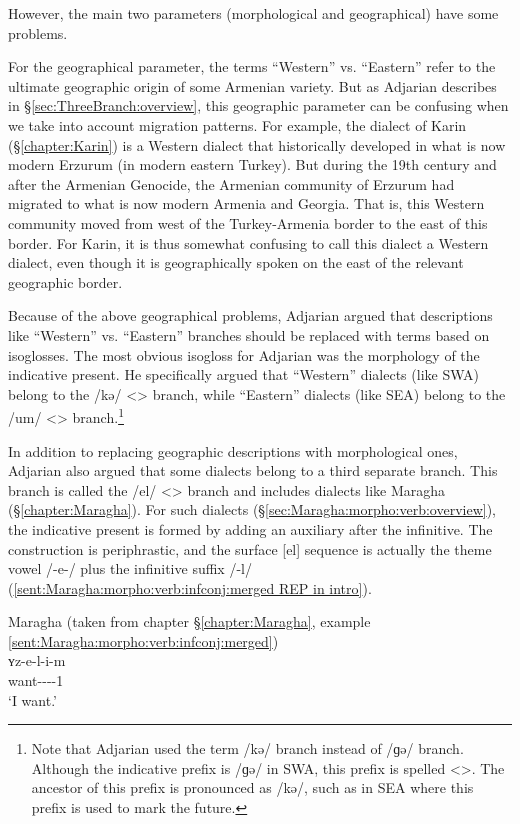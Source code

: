 \documentclass[output=paper]{langscibook}
\begin{document}
However, the main two parameters (morphological and geographical) have some problems. 

For the geographical parameter, the terms ``Western'' vs. ``Eastern'' refer to the ultimate geographic origin of some Armenian variety. But as Adjarian describes in \S\ref{sec:ThreeBranch:overview}, this geographic parameter can be confusing when we take into account migration patterns. For example, the dialect of Karin (\S\ref{chapter:Karin}) is a Western dialect that historically developed in what is now modern Erzurum (in modern eastern Turkey). But during the 19th century and after the Armenian Genocide, the Armenian community of Erzurum had migrated to what is now modern Armenia and Georgia. That is, this Western community moved from west of the Turkey-Armenia border to the east of this border. For Karin, it is thus somewhat confusing to call this dialect a Western dialect, even though it is geographically spoken on the east of the relevant geographic border.

Because of the above geographical problems, Adjarian argued that descriptions like ``Western'' vs. ``Eastern'' branches should be replaced with terms based on isoglosses. The most obvious isogloss for Adjarian was the morphology of the indicative present. He specifically argued that ``Western'' dialects (like SWA) belong to the /kə/ <> branch, while ``Eastern'' dialects (like SEA) belong to the /um/ <> branch.\footnote{Note that Adjarian used the term /kə/ branch instead of /ɡə/ branch. Although the indicative prefix is /ɡə/ in SWA, this prefix is spelled <>. The ancestor of this prefix is pronounced as /kə/, such as in SEA where this prefix is used to mark the  future.}

In addition to replacing geographic descriptions with morphological ones, Adjarian also argued that some dialects belong to a third separate branch. This branch is called the /el/ <> branch and includes dialects like Maragha (\S\ref{chapter:Maragha}). For such dialects (\S\ref{sec:Maragha:morpho:verb:overview}), the indicative present is formed by adding an auxiliary after the infinitive. The construction is periphrastic, and the surface [el] sequence is actually the theme vowel /-e-/ plus the infinitive suffix /-l/ (\ref{sent:Maragha:morpho:verb:infconj:merged REP in intro}). 

\begin{exe}
\ex Maragha (taken from chapter \S\ref{chapter:Maragha}, example \ref{sent:Maragha:morpho:verb:infconj:merged})\\
	 \gll ʏz-e-l-i-m \\
			want-{\thgloss}-{\infgloss}-{\aux}-1{\sg} \\
			\trans `I want.'\\
			 \label{sent:Maragha:morpho:verb:infconj:merged REP in intro}
\end{exe}
\end{document}
